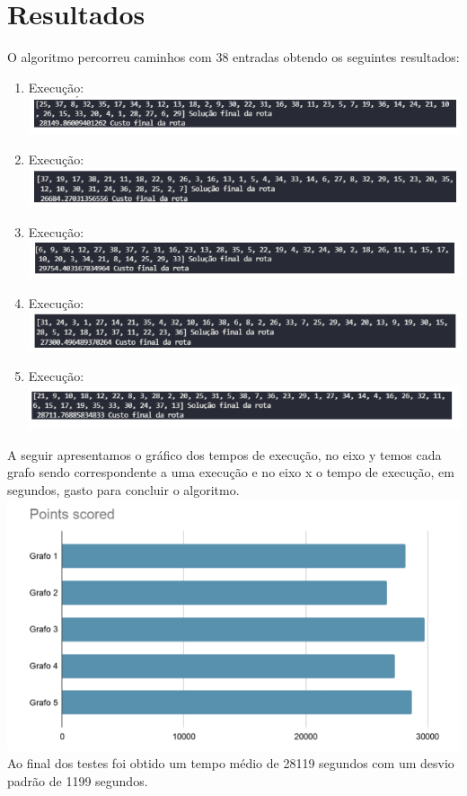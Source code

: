 \documentclass[12pt,openright,oneside,a4paper,brazil]{abntex2}
\begin{document}
\section{Resultados}
O algoritmo percorreu caminhos com 38 entradas obtendo os seguintes resultados: 
      \begin{enumerate}
      	\item Execução:	\\
			\includegraphics[scale=0.8]{caixeiro-execução1.png}
      	\item Execução:\\
			\includegraphics[scale=0.8]{caixeiro-execução2.png}		
      	\item Execução:\\
			\includegraphics[scale=0.8]{caixeiro-execução3.png}		
      	\item Execução:\\
			\includegraphics[scale=0.8]{caixeiro-execução4.png}
      	\item Execução:\\
			\includegraphics[scale=0.8]{caixeiro-execução6.png}		    	
      \end{enumerate}
A seguir apresentamos o gráfico dos tempos de execução, no eixo y temos cada grafo sendo correspondente a uma execução e no eixo x o tempo de execução, em segundos, gasto para concluir o algoritmo.\\
		      	\includegraphics[scale=0.8]{execução.png}		\\
Ao final dos testes foi obtido um tempo médio de 28119 segundos com um desvio padrão de 1199 segundos. 
\end{document}

